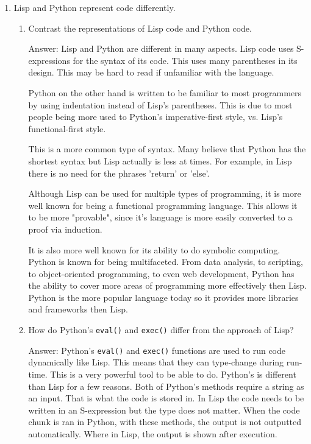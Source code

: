 \documentclass[12pt,letterpaper]{ntdhw}
\begin{document}
\begin{enumerate}
  \item Lisp and Python represent code differently.

  \begin{enumerate}
    \item Contrast the representations of Lisp code and Python code.

    \begin{emph}
      Answer: Lisp and Python are different in many aspects. Lisp code uses S-expressions for the syntax of its code. This uses
      many parentheses in its design. This may be hard to read if unfamiliar with the language.
      
      Python on the other hand is written to be familiar to most programmers by using indentation instead of Lisp's parentheses.
      This is due to most people being more used to Python's imperative-first style, vs. Lisp's functional-first style.

      This is a more common type of syntax. Many believe that Python has the shortest syntax but Lisp actually is less at times.
      For example, in Lisp there is no need for the phrases 'return' or 'else'.
      
      Although Lisp can be used for multiple types of programming, it is more well known for being a functional programming language.
      This allows it to be more "provable", since it's language is more easily converted to a proof via induction. 
      
      It is also more well known for its ability to do symbolic computing. Python is known for being multifaceted. From data analysis, to 
      scripting, to object-oriented programming, to even web development, Python has the ability to cover more areas of programming more
      effectively then Lisp. Python is the more popular language today so it provides more libraries and frameworks then Lisp.
    \end{emph}

    \item How do Python's {\tt eval()} and {\tt exec()} differ from
    the approach of Lisp?

    \begin{emph}
      Answer: Python's {\tt eval()} and {\tt exec()} functions are used to run code dynamically like Lisp. This means that they can type-change during run-time. This is a very powerful tool to be able to do. Python's is 
      different than Lisp for a few reasons. Both of Python's methods require a string as an input. That is what the code is stored in. In Lisp the code needs to be written in an S-expression but the type does not 
      matter. When the code chunk is ran in Python, with these methods, the output is not outputted automatically. Where in Lisp, the output is shown after execution. 
    \end{emph}
  \end{enumerate}


\end{enumerate}
\end{document}
